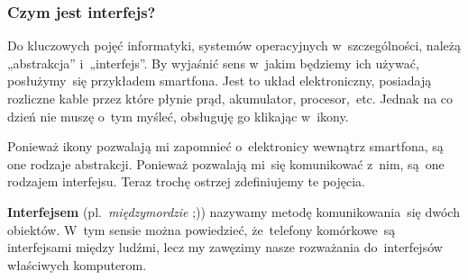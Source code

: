 \documentclass[10pt,t]{beamer}
\begin{document}
\begin{frame}
  \frametitle{Czym jest interfejs?}


  Do kluczowych pojęć informatyki, systemów operacyjnych w~szczególności,
  należą „abstrakcja” i~„interfejs”. By wyjaśnić sens w~jakim będziemy ich
  używać, posłużymy~się przykładem smartfona. Jest to układ elektroniczny,
  posiadają rozliczne kable przez które płynie prąd, akumulator,
  procesor,~etc. Jednak na co dzień nie muszę o~tym myśleć, obsługuję go
  klikając w~ikony.

  Ponieważ ikony pozwalają mi zapomnieć o~elektronicy wewnątrz smartfona,
  są one rodzaje abstrakcji. Ponieważ pozwalają mi~się komunikować z~nim,
  są~one rodzajem interfejsu. Teraz trochę ostrzej zdefiniujemy te pojęcia.

  \textbf{Interfejsem} (pl.~\textit{międzymordzie} ;)) nazywamy metodę
  komunikowania~się dwóch obiektów. W~tym sensie można powiedzieć,
  że~telefony komórkowe~są interfejsami między ludźmi, lecz my zawęzimy
  nasze rozważania do~interfejsów właściwych komputerom.



\end{frame}
\end{document}

